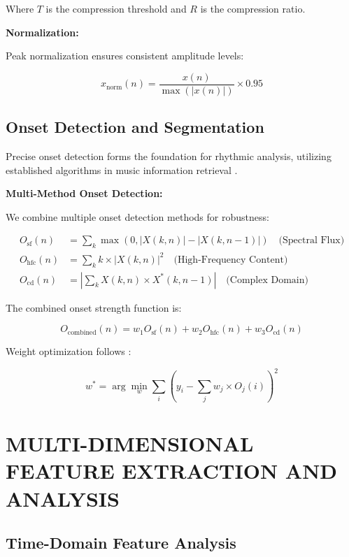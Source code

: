 \documentclass[12pt,a4paper]{article}
\begin{document}
Where $T$ is the compression threshold and $R$ is the compression ratio.

\textbf{Normalization:}

Peak normalization ensures consistent amplitude levels:

\begin{equation}
x_{\text{norm}}(n) = \frac{x(n)}{\max(|x(n)|)} \times 0.95
\end{equation}

\subsection{Onset Detection and Segmentation}

Precise onset detection forms the foundation for rhythmic analysis, utilizing established algorithms in music information retrieval \citep{bello2005tutorial, dixon2006onset}.

\textbf{Multi-Method Onset Detection:}

We combine multiple onset detection methods for robustness:

\begin{align}
O_{\text{sf}}(n) &= \sum_k \max(0, |X(k,n)| - |X(k,n-1)|) \quad \text{(Spectral Flux)} \\
O_{\text{hfc}}(n) &= \sum_k k \times |X(k,n)|^2 \quad \text{(High-Frequency Content)} \\
O_{\text{cd}}(n) &= |\sum_k X(k,n) \times X^*(k,n-1)| \quad \text{(Complex Domain)}
\end{align}

The combined onset strength function is:

\begin{equation}
O_{\text{combined}}(n) = w_1 O_{\text{sf}}(n) + w_2 O_{\text{hfc}}(n) + w_3 O_{\text{cd}}(n)
\end{equation}

Weight optimization follows \citet{bello2005tutorial}:

\begin{equation}
w^* = \arg\min_w \sum_i \left(y_i - \sum_j w_j \times O_j(i)\right)^2
\end{equation}

\section{MULTI-DIMENSIONAL FEATURE EXTRACTION AND ANALYSIS}

\subsection{Time-Domain Feature Analysis}
\end{document}
